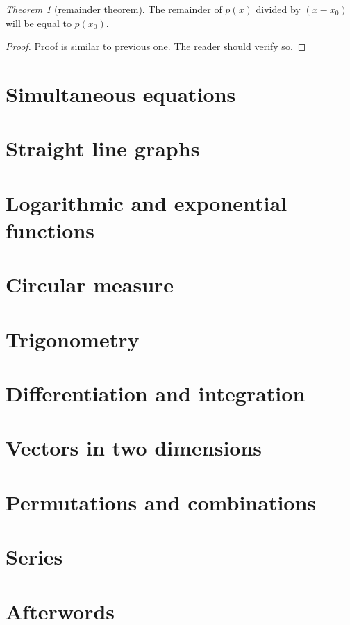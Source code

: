 \documentclass[8pt]{article}
\theoremstyle{remark}
\newtheorem{theorem}{Theorem}[section]
\begin{document}
        \begin{theorem}[remainder theorem]
            The remainder of $p(x)$ divided by $(x - x_0)$ will be equal to $p(x_0)$.

            \begin{proof}
                Proof is similar to previous one. The reader should verify so.
            \end{proof}
        \end{theorem}

    \section{Simultaneous equations}
        

    \section{Straight line graphs}

    \section{Logarithmic and exponential functions}

    \section{Circular measure}

    \section{Trigonometry}

    \section{Differentiation and integration}

    \section{Vectors in two dimensions}

    \section{Permutations and combinations}

    \section{Series}

    \section*{Afterwords}
        
\end{document}
